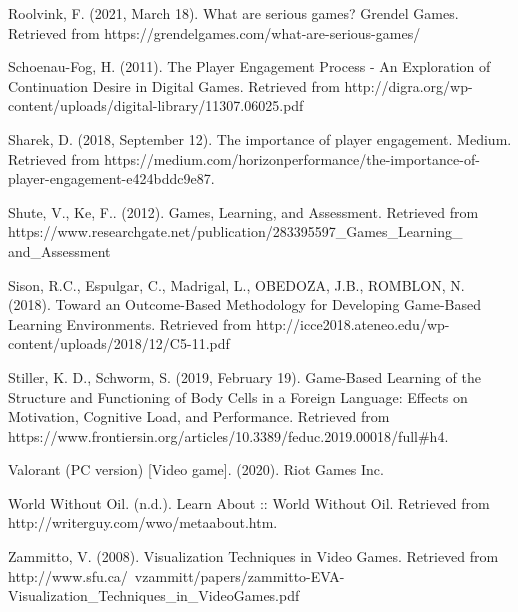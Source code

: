 \begin{adjustwidth}{0.1in}{0.1in}
Roolvink, F. (2021, March 18). What are serious games? Grendel Games. Retrieved from https://grendelgames.com/what-are-serious-games/

Schoenau-Fog, H. (2011). The Player Engagement Process - An Exploration of Continuation Desire in Digital Games. Retrieved from  http://digra.org/wp-content/uploads/digital-library/11307.06025.pdf

Sharek, D. (2018, September 12). The importance of player engagement. Medium. Retrieved from https://medium.com/horizonperformance/the-importance-of-player-engagement-e424bddc9e87. 

Shute, V., Ke, F.. (2012). Games, Learning, and Assessment. Retrieved from https://www.researchgate.net/publication/283395597\_Games\_Learning\_ \\ and\_Assessment

Sison, R.C., Espulgar, C., Madrigal, L., OBEDOZA, J.B., ROMBLON, N. (2018). Toward an Outcome-Based Methodology for Developing Game-Based Learning Environments. Retrieved from http://icce2018.ateneo.edu/wp-content/uploads/2018/12/C5-11.pdf

Stiller, K. D., Schworm, S. (2019, February 19). Game-Based Learning of the Structure and Functioning of Body Cells in a Foreign Language: Effects on Motivation, Cognitive Load, and Performance.  Retrieved from https://www.frontiersin.org/articles/10.3389/feduc.2019.00018/full\#h4.

Valorant (PC version) [Video game]. (2020). Riot Games Inc.

World Without Oil. (n.d.). Learn About :: World Without Oil. Retrieved from http://writerguy.com/wwo/metaabout.htm. 

Zammitto, V. (2008). Visualization Techniques in Video Games. Retrieved from http://www.sfu.ca/~vzammitt/papers/zammitto-EVA-Visualization\_Techniques\_in\_VideoGames.pdf
\end{adjustwidth}
\fussy
